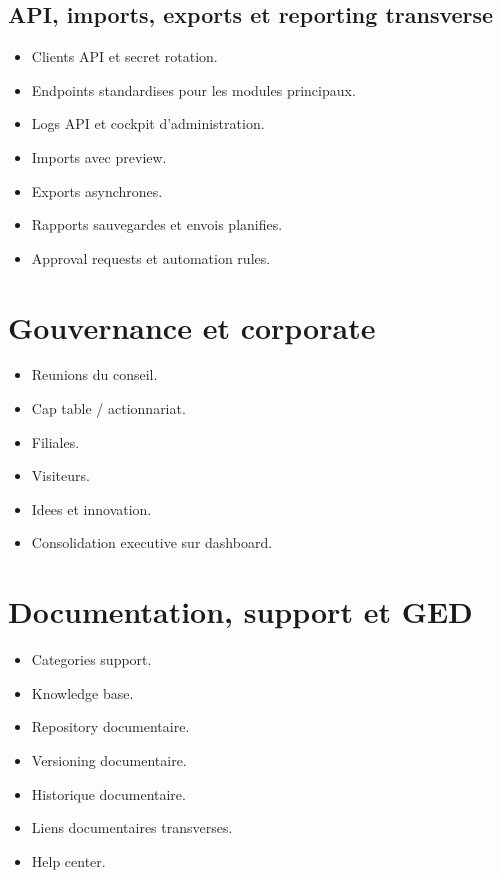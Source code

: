 \documentclass[11pt,a4paper]{article}
\begin{document}
\subsection{API, imports, exports et reporting transverse}
\begin{itemize}[leftmargin=1.2cm]
    \item Clients API et secret rotation.
    \item Endpoints standardises pour les modules principaux.
    \item Logs API et cockpit d'administration.
    \item Imports avec preview.
    \item Exports asynchrones.
    \item Rapports sauvegardes et envois planifies.
    \item Approval requests et automation rules.
\end{itemize}

\section{Gouvernance et corporate}
\begin{itemize}[leftmargin=1.2cm]
    \item Reunions du conseil.
    \item Cap table / actionnariat.
    \item Filiales.
    \item Visiteurs.
    \item Idees et innovation.
    \item Consolidation executive sur dashboard.
\end{itemize}

\section{Documentation, support et GED}
\begin{itemize}[leftmargin=1.2cm]
    \item Categories support.
    \item Knowledge base.
    \item Repository documentaire.
    \item Versioning documentaire.
    \item Historique documentaire.
    \item Liens documentaires transverses.
    \item Help center.
\end{itemize}
\end{document}
